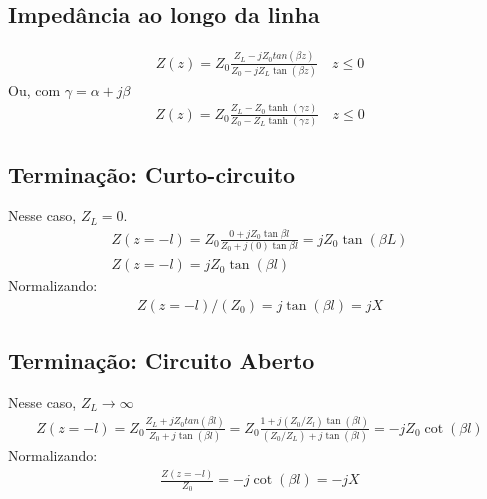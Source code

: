 \documentclass[11pt,a4paper]{article}
\begin{document}
\subsection{Impedância ao longo da linha}
\begin{align*}
  Z(z)= Z_0 \frac{Z_L - jZ_0 tan(\beta z)}{Z_0 - j Z_L \tan (\beta z)} \quad z \leq 0 
\end{align*}
Ou, com $\gamma = \alpha + j \beta$ 
\begin{align*}
  Z(z)= Z_0 \frac{Z_L - Z_0 \tanh(\gamma z)}{Z_0 - Z_L \tanh (\gamma z)} \quad z \leq 0
\end{align*}
\subsection{Terminação: Curto-circuito}
Nesse caso, $Z_L = 0$.
\begin{align*}
  Z(z=-l)= Z_0 \frac{0+j Z_0 \tan \beta l}{Z_0 + j(0) \tan \beta l}= j Z_0 \tan(\beta L)\\
  Z(z= -l)= j Z_0 \tan (\beta l)
\end{align*}
Normalizando:
\begin{align*}
  Z(z=-l)/(Z_0)= j \tan (\beta l) = jX
\end{align*}
\subsection{Terminação: Circuito Aberto}
Nesse caso, $Z_L \to \infty$
\begin{align*}
  Z(z=-l) = Z_0 \frac{Z_L+ jZ_0 tan(\beta l)}{Z_0 + j\tan(\beta l)}= Z_0 \frac{1+j(Z_0/Z_l)\tan(\beta l)}{(Z_0/Z_L)+j \tan(\beta l)} = -j Z_0 \cot (\beta l)
\end{align*}
Normalizando:
\begin{align*}
  \frac{Z(z=-l)}{Z_0}= -j \cot (\beta l) = -j X
\end{align*}
\end{document}
